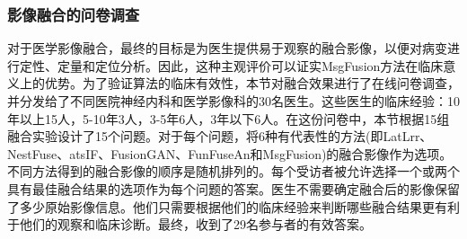 \subsubsection{影像融合的问卷调查}
对于医学影像融合，最终的目标是为医生提供易于观察的融合影像，以便对病变进行定性、定量和定位分析。因此，这种主观评价可以证实MsgFusion方法在临床意义上的优势。为了验证算法的临床有效性，本节对融合效果进行了在线问卷调查，并分发给了不同医院神经内科和医学影像科的30名医生。这些医生的临床经验：10年以上15人，5-10年3人，3-5年6人，3年以下6人。在这份问卷中，本节根据15组融合实验设计了15个问题。对于每个问题，将6种有代表性的方法(即LatLrr、NestFuse、atsIF、FusionGAN、FunFuseAn和MsgFusion)的融合影像作为选项。不同方法得到的融合影像的顺序是随机排列的。每个受访者被允许选择一个或两个具有最佳融合结果的选项作为每个问题的答案。医生不需要确定融合后的影像保留了多少原始影像信息。他们只需要根据他们的临床经验来判断哪些融合结果更有利于他们的观察和临床诊断。最终，收到了29名参与者的有效答案。
